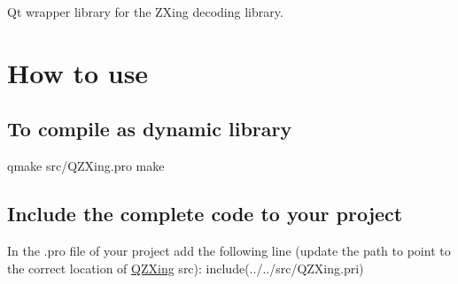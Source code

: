Qt wrapper library for the Z\+Xing decoding library.

\section*{How to use}

\subsection*{To compile as dynamic library}

qmake src/\+Q\+Z\+Xing.\+pro make

\subsection*{Include the complete code to your project}

In the .pro file of your project add the following line (update the path to point to the correct location of \mbox{\hyperlink{class_q_z_xing}{Q\+Z\+Xing}} src)\+: include(../../src/\+Q\+Z\+Xing.pri) 